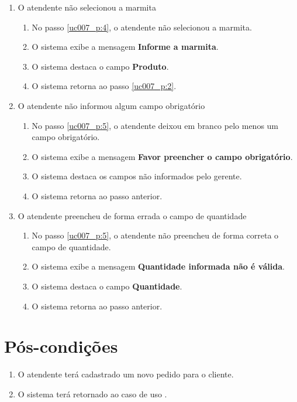 \begin{enumerate}[label=E\arabic*]
	\item O atendente não selecionou a marmita \label{uc007_e:1}
	\begin{enumerate}[label*=.\arabic*]
		\item[] No passo \ref{uc007_p:4}, o atendente não selecionou a marmita.
		\item O sistema exibe a mensagem \textbf{Informe a marmita}.
		\item O sistema destaca o campo \textbf{Produto}.
		\item O sistema retorna ao passo \ref{uc007_p:2}.
	\end{enumerate}
	
	\item O atendente não informou algum campo obrigatório \label{uc007_e:2}
	\begin{enumerate}[label*=.\arabic*]
		\item[] No passo \ref{uc007_p:5}, o atendente deixou em branco pelo menos um campo obrigatório.
		\item O sistema exibe a mensagem \textbf{Favor preencher o campo obrigatório}.
		\item O sistema destaca os campos não informados pelo gerente.
		\item O sistema retorna ao passo anterior.
	\end{enumerate}
	
	\item O atendente preencheu de forma errada o campo de quantidade \label{uc007_e:3}
	\begin{enumerate}[label*=.\arabic*]		
		\item[] No passo \ref{uc007_p:5}, o atendente não preencheu de forma correta o campo de quantidade.		
		\item O sistema exibe a mensagem \textbf{Quantidade informada não é válida}.
		\item O sistema destaca o campo \textbf{Quantidade}.
		\item O sistema retorna ao passo anterior.
	\end{enumerate}
\end{enumerate}

\section{Pós-condições}

\begin{enumerate}
	\item O atendente terá cadastrado um novo pedido para o cliente.
	\item O sistema terá retornado ao caso de uso .	
\end{enumerate}

